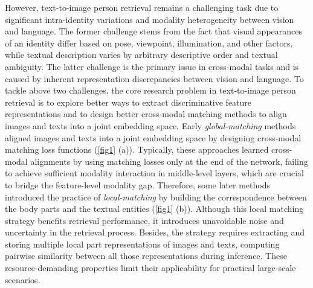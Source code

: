 \documentclass[10pt,twocolumn,letterpaper]{article}
\begin{document}
However, text-to-image person retrieval remains a challenging task due to significant intra-identity variations and modality heterogeneity between vision and language. The former challenge stems from the fact that visual appearances of an identity differ based on pose, viewpoint, illumination, and other factors, while textual description varies by arbitrary descriptive order and textual ambiguity. The latter challenge is the primary issue in cross-modal tasks and is caused by inherent representation discrepancies between vision and language.
To tackle above two challenges, the core research problem in text-to-image person retrieval is to explore better ways to extract discriminative feature representations and to design better cross-modal matching methods to align images and texts into a joint embedding space. 
Early \textit{global-matching} methods\cite{zhang2018deep, zheng2020dual} aligned images and texts into a joint embedding space by designing cross-modal matching loss functions (\cref{fig1} (a)). Typically, these approaches learned cross-modal alignments by using matching losses only at the end of the network, failing to achieve sufficient modality interaction in middle-level layers, which are crucial to bridge the feature-level modality gap.
Therefore, some later methods\cite{jing2020pose, wang2020vitaa, chen2022tipcb, ding2021semantically} introduced the practice of \textit{local-matching} by building the correspondence between the body parts and the textual entities (\cref{fig1} (b)). 
Although this local matching strategy benefits retrieval performance, it introduces unavoidable noise and uncertainty in the retrieval process. 
Besides, the strategy requires extracting and storing multiple local part representations of images and texts, computing pairwise similarity between all those representations during inference. These resource-demanding properties limit their applicability for practical large-scale scenarios. 
\end{document}
